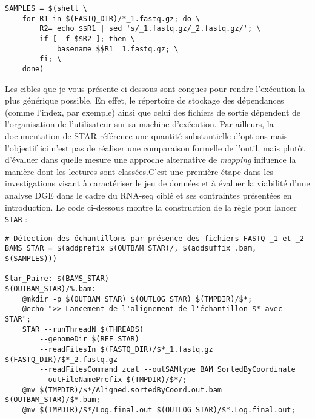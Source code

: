 \begin{lstlisting}[style=makefileStyle, label={lst:FASTQGen}, caption={\underline{Construction de la variable \texttt{SAMPLES} pour traiter séquentiellement les \texttt{FASTQ}}}]
SAMPLES = $(shell \
    for R1 in $(FASTQ_DIR)/*_1.fastq.gz; do \
        R2= echo $$R1 | sed 's/_1.fastq.gz/_2.fastq.gz/'; \
        if [ -f $$R2 ]; then \
            basename $$R1 _1.fastq.gz; \
        fi; \
    done)
\end{lstlisting}

Les cibles que je vous présente ci-dessous sont conçues pour rendre l'exécution la plus générique possible. En effet, le répertoire de stockage des dépendances (comme l'index, par exemple) ainsi que celui des fichiers de sortie dépendent de l'organisation de l'utilisateur sur sa machine d'exécution. Par ailleurs, la documentation de STAR référence une quantité substantielle d'options mais l'objectif ici n'est pas de réaliser une comparaison formelle de l'outil, mais plutôt d'évaluer dans quelle mesure une approche alternative de \textit{mapping} influence la manière dont les lectures sont classées.C'est une première étape dans les investigations visant à caractériser le jeu de données et à évaluer la viabilité d'une analyse DGE dans le cadre du RNA-seq ciblé et ses contraintes présentées en introduction. Le code ci-dessous montre la construction de la règle pour lancer \texttt{STAR} :

\begin{lstlisting}[style=makefileStyle, label={lst:STARAlign}, caption={\underline{Cible \texttt{Star\_Paire} pour générer les \texttt{BAM} avec STAR}}]
# Détection des échantillons par présence des fichiers FASTQ _1 et _2
BAMS_STAR = $(addprefix $(OUTBAM_STAR)/, $(addsuffix .bam, $(SAMPLES)))

Star_Paire: $(BAMS_STAR)
$(OUTBAM_STAR)/%.bam:
	@mkdir -p $(OUTBAM_STAR) $(OUTLOG_STAR) $(TMPDIR)/$*;
	@echo ">> Lancement de l'alignement de l'échantillon $* avec STAR";
	STAR --runThreadN $(THREADS)  
		--genomeDir $(REF_STAR)  
		--readFilesIn $(FASTQ_DIR)/$*_1.fastq.gz $(FASTQ_DIR)/$*_2.fastq.gz 
		--readFilesCommand zcat --outSAMtype BAM SortedByCoordinate 
		--outFileNamePrefix $(TMPDIR)/$*/;
	@mv $(TMPDIR)/$*/Aligned.sortedByCoord.out.bam $(OUTBAM_STAR)/$*.bam;
	@mv $(TMPDIR)/$*/Log.final.out $(OUTLOG_STAR)/$*.Log.final.out;
\end{lstlisting}

